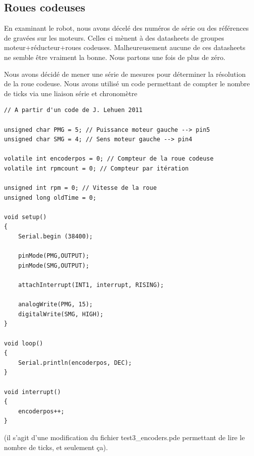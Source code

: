 \documentclass[a4paper]{report}
\begin{document}
\subsection{Roues codeuses%
  \label{roues-codeuses}%
}

En examinant le robot, nous avons décelé des numéros de série ou des références de gravées sur les moteurs.
Celles ci mènent à des datasheets de groupes moteur+réducteur+roues codeuses.
Malheureusement aucune de ces datasheets ne semble être vraiment la bonne.
Nous partons une fois de plus de zéro.

Nous avons décidé de mener une série de mesures pour déterminer la résolution de la roue codeuse.
Nous avons utilisé un code permettant de compter le nombre de ticks via une liaison série et chronomètre

\begin{verbatim}
// A partir d'un code de J. Lehuen 2011

unsigned char PMG = 5; // Puissance moteur gauche --> pin5
unsigned char SMG = 4; // Sens moteur gauche --> pin4

volatile int encoderpos = 0; // Compteur de la roue codeuse
volatile int rpmcount = 0; // Compteur par itération

unsigned int rpm = 0; // Vitesse de la roue
unsigned long oldTime = 0;

void setup()
{
    Serial.begin (38400);

    pinMode(PMG,OUTPUT);
    pinMode(SMG,OUTPUT);

    attachInterrupt(INT1, interrupt, RISING);

    analogWrite(PMG, 15);
    digitalWrite(SMG, HIGH);
}

void loop()
{
    Serial.println(encoderpos, DEC);
}

void interrupt()
{
    encoderpos++;
}
\end{verbatim}

(il s'agit d'une modification du fichier test3\_encoders.pde permettant de lire le nombre de ticks, et seulement ça).
\end{document}
